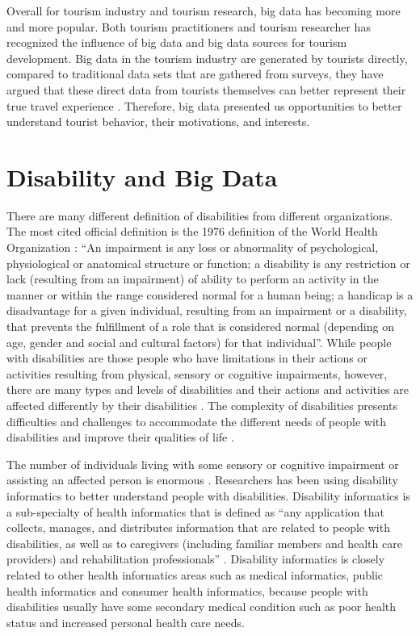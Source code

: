 Overall for tourism industry and tourism research, big data has becoming more and more popular. 
Both tourism practitioners and tourism researcher has recognized the
influence of big data and big data sources for tourism development. Big data in the
tourism industry are generated by tourists directly, compared to traditional data sets
that are gathered from surveys, they have argued that these direct data from tourists themselves 
can better represent their true travel experience \cite{GUO2017467}. 
Therefore, big data presented us opportunities to
better understand tourist behavior, their motivations, and interests. 

\section{Disability and Big Data}
There are many different definition of disabilities from different organizations. The most cited official
definition is the 1976 definition of the World Health Organization \cite{Appleyard2005}: ``An impairment is
any loss or abnormality of psychological, physiological or anatomical structure or function; a disability
is any restriction or lack (resulting from an impairment) of ability to perform an activity in the manner
or within the range considered normal for a human being; a handicap is a disadvantage for a given
individual, resulting from an impairment or a disability, that prevents the fulfillment of a role that is
considered normal (depending on age, gender and social and cultural factors) for that individual''. While
people with disabilities are those people who have limitations in their actions or activities resulting
from physical, sensory or cognitive impairments, however, there are many types and levels of disabilities and their
actions and activities are affected differently by their disabilities \cite{Appleyard2005}. The complexity
of disabilities presents difficulties and challenges to accommodate the different needs of people with
disabilities and improve their qualities of life \cite{Datapop}. 

The number of individuals living with some sensory or cognitive impairment or assisting an affected person
is enormous \cite{Riga13}. Researchers has been using disability informatics to better understand people with
disabilities. Disability informatics is a sub-specialty of health informatics that is defined as 
``any application that collects, manages, and distributes information that are related to people 
with disabilities, as well as to caregivers (including familiar members and health care providers) 
and rehabilitation professionals'' \cite{Appleyard2005}. Disability informatics is closely
related to other health informatics areas such as medical informatics, public health informatics
and consumer health informatics, because people with disabilities usually have some secondary
medical condition such as poor health status and increased personal health care needs. 

